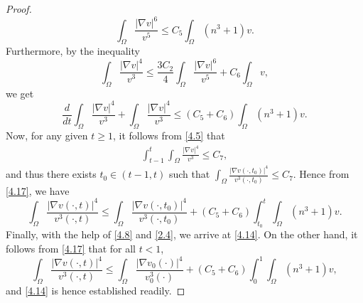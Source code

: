 \documentclass[12pt]{article}
\theoremstyle{plain}
\theoremstyle{definition}
\numberwithin{equation}{section}
\begin{document}
\begin{proof}
\begin{equation}
\int_\Omega \frac{|\nabla v|^6}{ v^5}
\leq C_5\int_\Omega (n^3+1)v.
\end{equation}
Furthermore, by the inequality
$$
 \int_\Omega\frac{|\nabla v|^4}{ v^3}\leq \frac {3C_2}4
\int_\Omega \frac{|\nabla v|^6}{ v^5}+C_6 \int_\Omega   v,
$$
we get
\begin{equation}\label{4.17}
\frac d{dt} \int_\Omega  \frac{|\nabla v|^4}{v^3}+
\int_\Omega \frac{|\nabla v|^4}{ v^3}
\leq (C_5+C_6)\int_\Omega (n^3+1)v.
\end{equation}
 Now, for any given $t\geq 1$, it follows from \eqref{4.5} that
\begin{equation*}
\begin{split}
 \int^{t}_{t-1} \int_\Omega  \frac{|\nabla v|^4}{v^3} \leq C_7,
\end{split}
\end{equation*}
and thus there exists $t_0\in(t-1,t)$ such that $\int_\Omega  \frac{|\nabla v(\cdot,t_0)|^4}{v^3(\cdot,t_0)} \leq C_7$.
Hence from \eqref{4.17}, we have
\begin{equation}\label{4.18}
\int_\Omega\frac{|\nabla v(\cdot,t)|^4}{ v^3(\cdot,t)}\leq
\int_\Omega\frac{|\nabla v(\cdot,t_0)|^4}{ v^3(\cdot,t_0)}  +   (C_5+C_6)\int^{t}_{t_0}  \int_\Omega (n^3+1)v.
\end{equation}
Finally, with the help of \eqref{4.8} and \eqref{2.4}, we arrive at \eqref{4.14}. On the other hand, it follows from
 \eqref{4.17} that for all $t< 1$,
\begin{equation*}
\int_\Omega\frac{|\nabla v(\cdot,t)|^4}{ v^3(\cdot,t)}\leq
\int_\Omega\frac{|\nabla v_0(\cdot)|^4}{ v_0^3(\cdot)}  +   (C_5+C_6)\int^{1}_{0}  \int_\Omega (n^3+1)v,
\end{equation*}
and  \eqref{4.14} is hence established readily.
\end{proof}
\end{document}
